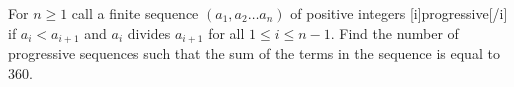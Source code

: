 For $n \ge 1$ call a finite sequence $(a_1, a_2 \ldots a_n)$ of positive integers [i]progressive[/i] if $a_i < a_{i+1}$ and $a_i$ divides $a_{i+1}$ for all $1 \le i \le n-1$. Find the number of progressive sequences such that the sum of the terms in the sequence is equal to $360$.